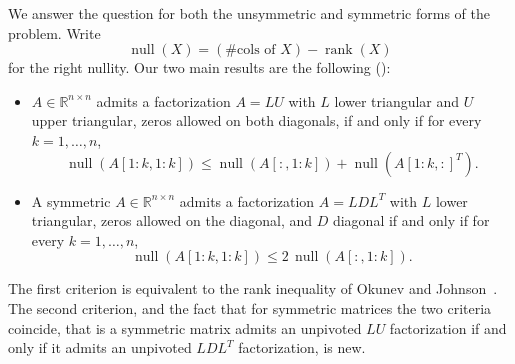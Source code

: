 \documentclass[preprint,12pt]{elsarticle}
\theoremstyle{plain}
\theoremstyle{nonumberplain}
\numberwithin{equation}{section}
\DeclareMathOperator{\rk}{rank}
\DeclareMathOperator{\nl}{null}
\newcommand{\by}{\times}
\numberwithin{theorem}{section}
\begin{document}
We answer the question for both the unsymmetric and symmetric forms of the
problem.  Write
$$
\nl(X)=(\#\text{cols of }X)-\rk(X)
$$
for the right nullity.
Our two main results are the following ():
\begin{itemize}
  \item $A \in \mathbb{R}^{n \by n}$ admits a factorization $A = LU$ with $L$
    lower triangular and $U$ upper triangular, zeros allowed on both diagonals,
    if and only if for every $k = 1, \ldots, n$,
    \[
      \nl(A[1:k,1:k]) \le \nl(A[:,1:k]) + \nl({A[1:k,:]}^T) .
    \]
  \item A symmetric $A \in \mathbb{R}^{n \by n}$ admits a factorization
    $A = LDL^T$ with $L$ lower triangular, zeros allowed on the diagonal, and
    $D$ diagonal if and only if for every $k = 1, \ldots, n$,
    \[
      \nl(A[1:k,1:k]) \le 2\,\nl(A[:,1:k]) .
    \]
\end{itemize}
The first criterion is equivalent to the rank inequality of Okunev and Johnson~\cite{okunev_johnson_2005,johnson_okunev_2025}.  The second criterion, and the fact that for symmetric matrices the two criteria coincide, that is a symmetric matrix admits an unpivoted $LU$ factorization if and only if it admits an unpivoted $LDL^T$ factorization, is new.
\end{document}
